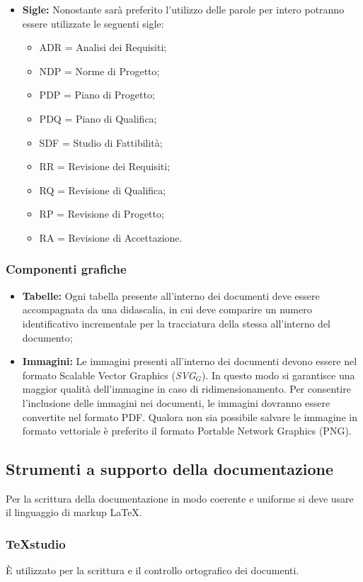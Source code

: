 \begin{itemize}
	\item \textbf{Sigle:} Nonostante sarà preferito l'utilizzo delle parole per intero potranno essere utilizzate le seguenti sigle:
	\begin{itemize}
	\item ADR = Analisi dei Requisiti;
	\item NDP = Norme di Progetto;
	\item PDP = Piano di Progetto;
	\item PDQ = Piano di Qualifica;
	\item SDF = Studio di Fattibilità;
	\item RR = Revisione dei Requisiti;
	\item RQ = Revisione di Qualifica;
	\item RP = Revisione di Progetto;
	\item RA = Revisione di Accettazione.
	\end{itemize}
\end{itemize}
\subsubsection{Componenti grafiche}
	\begin{itemize}
	\item \textbf{Tabelle:} 
	Ogni tabella presente all'interno dei documenti deve essere accompagnata da una didascalia,	in cui deve comparire un numero identificativo incrementale per la tracciatura della stessa all'interno del documento;
	\item \textbf{Immagini:}
	Le immagini presenti all'interno dei documenti devono essere nel formato Scalable Vector Graphics (\textit{SVG$_{G}$}). In questo modo si garantisce una maggior qualità dell'immagine in caso di ridimensionamento. Per consentire l’inclusione delle immagini nei documenti,
	le immagini dovranno essere convertite nel formato PDF. Qualora non sia possibile
	salvare le immagine in formato vettoriale è preferito il formato Portable Network
	Graphics (PNG).
	\end{itemize}
\subsection{Strumenti a supporto della documentazione}
Per la scrittura della documentazione in modo coerente e uniforme si deve usare il linguaggio di markup \LaTeX.
\subsubsection{TeXstudio}
\`{E} utilizzato per la scrittura e il controllo ortografico dei documenti.
